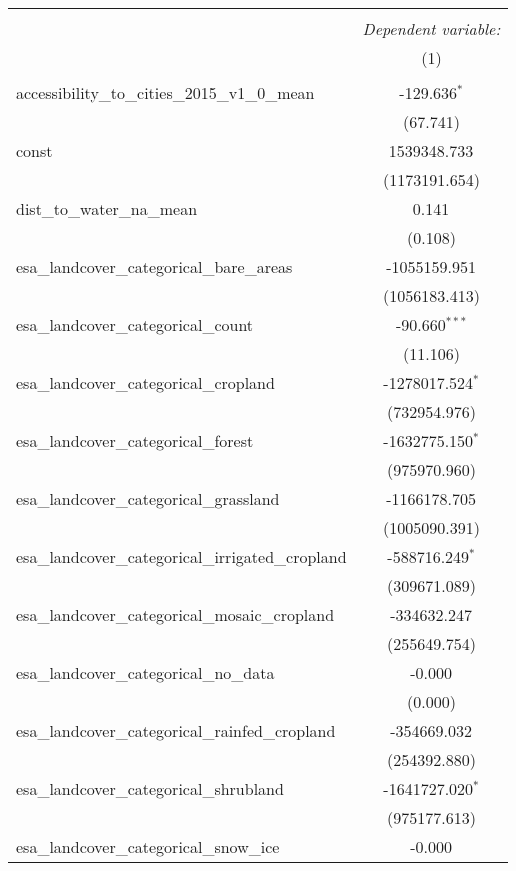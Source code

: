 \begin{table}[!htbp] \centering
\begin{tabular}{@{\extracolsep{5pt}}lc}
\\[-1.8ex]\hline
\hline \\[-1.8ex]
& \multicolumn{1}{c}{\textit{Dependent variable:}} \
\cr \cline{1-2}
\\[-1.8ex] & (1) \\
\hline \\[-1.8ex]
 accessibility_to_cities_2015_v1_0_mean & -129.636$^{*}$ \\
  & (67.741) \\
 const & 1539348.733$^{}$ \\
  & (1173191.654) \\
 dist_to_water_na_mean & 0.141$^{}$ \\
  & (0.108) \\
 esa_landcover_categorical_bare_areas & -1055159.951$^{}$ \\
  & (1056183.413) \\
 esa_landcover_categorical_count & -90.660$^{***}$ \\
  & (11.106) \\
 esa_landcover_categorical_cropland & -1278017.524$^{*}$ \\
  & (732954.976) \\
 esa_landcover_categorical_forest & -1632775.150$^{*}$ \\
  & (975970.960) \\
 esa_landcover_categorical_grassland & -1166178.705$^{}$ \\
  & (1005090.391) \\
 esa_landcover_categorical_irrigated_cropland & -588716.249$^{*}$ \\
  & (309671.089) \\
 esa_landcover_categorical_mosaic_cropland & -334632.247$^{}$ \\
  & (255649.754) \\
 esa_landcover_categorical_no_data & -0.000$^{}$ \\
  & (0.000) \\
 esa_landcover_categorical_rainfed_cropland & -354669.032$^{}$ \\
  & (254392.880) \\
 esa_landcover_categorical_shrubland & -1641727.020$^{*}$ \\
  & (975177.613) \\
 esa_landcover_categorical_snow_ice & -0.000$^{}$ \\

\end{tabular}
\end{table}
